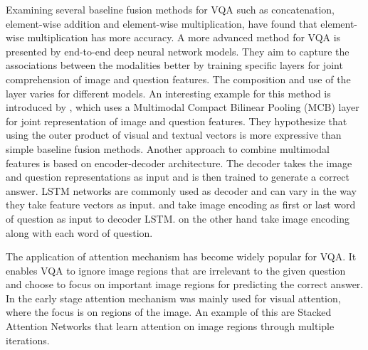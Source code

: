 \documentclass{article}
\begin{document}
Examining several baseline fusion methods for VQA such as concatenation, element-wise addition and element-wise multiplication, \citet{malinowski2017ask} have found that element-wise multiplication has more accuracy. A more advanced method for VQA is presented by end-to-end deep neural network models. They aim to capture the associations between the modalities better by training specific layers for joint comprehension of image and question features. The composition and use of the layer varies for different models. An interesting example for this method is introduced by \citet{fukui2016multimodal}, which uses a Multimodal Compact Bilinear Pooling (MCB) layer for joint representation of image and question features. They hypothesize that using the outer product of visual and textual vectors is more expressive than simple baseline fusion methods. Another approach to combine multimodal features is based on encoder-decoder architecture. The decoder takes the image and question representations as input and is then trained to generate a correct answer. LSTM networks are commonly used as decoder and can vary in the way they take feature vectors as input. \citet{ren2015exploring} and \citet{zhu2016cvpr} take image encoding as first or last word of question as input to decoder LSTM. \citet{malinowski2017ask} on the other hand take image encoding along with each word of question.

The application of attention mechanism has become widely popular for VQA. It enables VQA to ignore image regions that are irrelevant to the given question and choose to focus on important image regions for predicting the correct answer. In the early stage attention mechanism was mainly used for visual attention, where the focus is on regions of the image. An example of this are Stacked Attention Networks \citep{yang2016vqa} that learn attention on image regions through multiple iterations.
\end{document}
